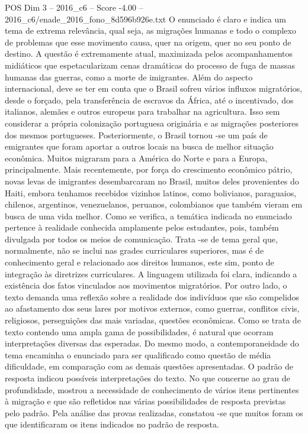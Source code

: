 \begin{textsample}{POS Dim 3 – 2016\_c6 – Score -4.00 – 2016\_c6/enade\_2016\_fono\_8d596b926e.txt}
O enunciado é claro e indica um tema de extrema relevância, qual seja, as migrações humanas e todo o complexo de problemas que esse movimento causa, quer na origem, quer no seu ponto de destino.
A questão é extremamente atual, maximizada pelos acompanhamentos midiáticos que espetacularizam cenas dramáticas do processo de fuga de massas humanas das guerras, como a morte de imigrantes.
Além do aspecto internacional, deve se ter em conta que o Brasil sofreu vários influxos migratórios, desde o forçado, pela transferência de escravos da África, até o incentivado, dos italianos, alemães e outros europeus para trabalhar na agricultura.
Isso sem considerar a própria colonização portuguesa originária e as migrações posteriores dos mesmos portugueses.
Posteriormente, o Brasil tornou -se um país de emigrantes que foram aportar a outros locais na busca de melhor situação econômica.
Muitos migraram para a América do Norte e para a Europa, principalmente.
Mais recentemente, por força do crescimento econômico pátrio, novas levas de imigrantes desembarcaram no Brasil, muitos deles provenientes do Haiti, embora tenhamos recebidos vizinhos latinos, como bolivianos, paraguaios, chilenos, argentinos, venezuelanos, peruanos, colombianos que também vieram em busca de uma vida melhor.
Como se verifica, a temática indicada no enunciado pertence à realidade conhecida amplamente pelos estudantes, pois, também divulgada por todos os meios de comunicação.
Trata -se de tema geral que, normalmente, não se inclui nas grades curriculares superiores, mas é de conhecimento geral e relacionado aos direitos humanos, este sim, ponto de integração às diretrizes curriculares.
A linguagem utilizada foi clara, indicando a existência dos fatos vinculados aos movimentos migratórios.
Por outro lado, o texto demanda uma reflexão sobre a realidade dos indivíduos que são compelidos ao afastamento dos seus lares por motivos externos, como guerras, conflitos civis, religiosos, perseguições das mais variadas, questões econômicas.
Como se trata de texto contendo uma ampla gama de possibilidades, é natural que ocorram interpretações diversas das esperadas.
Do mesmo modo, a contemporaneidade do tema encaminha o enunciado para ser qualificado como questão de média dificuldade, em comparação com as demais questões apresentadas.
O padrão de resposta indicou possíveis interpretações do texto.
No que concerne ao grau de profundidade, mostrou a necessidade de conhecimento de vários itens pertinentes à migração e que são refletidos nas várias possibilidades de resposta previstas pelo padrão.
Pela análise das provas realizadas, constatou -se que muitos foram os que identificaram os itens indicados no padrão de resposta.

\end{textsample}
